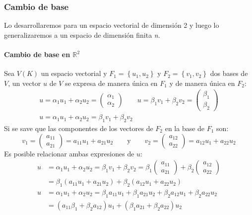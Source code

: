 \subsubsection{Cambio de base}

Lo desarrollaremos para un espacio vectorial de dimensión 2 y luego lo generalizaremos a un espacio de dimensión finita \textit{n}.

\paragraph{Cambio de base en \(\mathbb{R}^2\)}

Sea \(V(K)\) un espacio vectorial y \(F_1 = \left\{u_1, u_2\right\}\) y \(F_2 = \left\{v_1, v_2\right\}\) dos bases de \(V\), un vector \(u\) de \(V\) se expresa de manera única en \(F_1\) y de manera única en \(F_2\):
\begin{gather*}
  u = \alpha_1 u_1 + \alpha_2 u_2 = \begin{pmatrix}
    \alpha_1 \\ \alpha_2
  \end{pmatrix} \qquad u = \beta_1 v_1 + \beta_2 v_2 = \begin{pmatrix}
    \beta_1 \\ \beta_2
  \end{pmatrix} \\[3pt]
  u = \alpha_1 u_1 + \alpha_2 u_2 = \beta_1 v_1 + \beta_2 v_2
\end{gather*}
Si se save que las componentes de los vectores de \(F_2\) en la base de \(F_1\) son:
\[
  v_1 = \begin{pmatrix}
    a_{11} \\ a_{21}
  \end{pmatrix} = a_{11} u_1 + a_{21} u_2 \qquad \text{y} \qquad v_2 = \begin{pmatrix}
    a_{12} \\ a_{22}
  \end{pmatrix} = a_{12} u_1 + a_{22} u_2
\]
Es posible relacionar ambas expresiones de \(u\):
\begin{align*}
  u &= \alpha_1 u_1 + \alpha_2 u_2 = \beta_1 v_1 + \beta_2 v_2 = \beta_1 \begin{pmatrix}
    a_{11} \\ a_{21}
  \end{pmatrix} + \beta_2 \begin{pmatrix}
    a_{12} \\ a_{22}
  \end{pmatrix} \\
  &= \beta_1 (a_{11} u_1 + a_{21}u_2) + \beta_2 (a_{12}u_1 + a_{22}u_2)\\[5pt]
  u &= \alpha_1 u_1 + \alpha_2 u_2 = \beta_1 a_{11} u_1 + \beta_1 a_{21} u_2 + \beta_2 a_{12}u_1 + \beta_2 a_{22}u_2\\
  &= (a_{11}\beta_1 + \beta_2 a_{12}) u_1 + (\beta_1 a_{21} + \beta_2 a_{22}) u_2
\end{align*}
